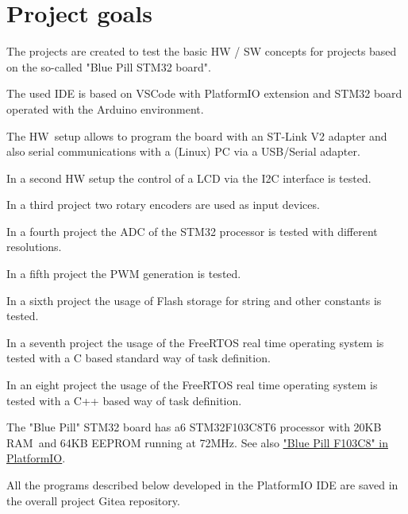 \documentclass[11pt, oneside]{scrartcl}   	%
\begin{document}
\newpage
\thispagestyle{empty}
\tableofcontents
\newpage

\newpage
\thispagestyle{empty}
\listoffigures
\listoftables

\newpage
\pagestyle{scrheadings}
\section{Project goals}
The projects are created to test the basic HW / SW concepts for projects based on the so-called "Blue Pill STM32 board".

The used IDE is based on VSCode with PlatformIO extension and STM32 board operated with the Arduino environment.

The HW setup allows to program the board with an ST-Link V2 adapter and also serial communications with a (Linux) PC
via a USB/Serial adapter.

In a second HW setup the control of a LCD via the I2C interface is tested.

In a third project two rotary encoders are used as input devices.

In a fourth project the ADC of the STM32 processor is tested with different resolutions.

In a fifth project the PWM generation is tested.

In a sixth project the usage of Flash storage for string and other constants is tested.

In a seventh project the usage of the FreeRTOS real time operating system is tested with a C based standard way of task definition.
 
In an eight project the usage of the FreeRTOS real time operating system is tested with a C++ based way of task definition.

The "Blue Pill" STM32 board has a6 STM32F103C8T6 processor with 20KB RAM and 64KB EEPROM running at 72MHz.
See also \href{https://docs.platformio.org/en/latest//boards/ststm32/bluepill_f103c8.html}{"Blue Pill F103C8" in PlatformIO}.

All the programs described below developed in the PlatformIO IDE are saved in the overall project Gitea repository.
\end{document}
